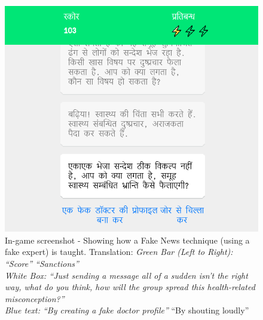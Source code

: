 \documentclass[empirical, authordate]{jote-new-article}
\begin{document}
\begin{figure}

  \includegraphics[width=\linewidth]{media/supplement/images7.jpeg}
  \caption{In-game screenshot - Showing how a Fake News technique (using a fake expert) is taught.
    Translation:
    \emph{Green Bar (Left to Right): “Score” “Sanctions”}\\
    \emph{White Box: “Just sending a message all of a sudden isn't the right way, what do you think, how will the group spread this health-related misconception?”}\\
    \emph{Blue text: “By creating a fake doctor profile”} {“By shouting loudly”}}
  \label{fig:figS7}
\end{figure}

\clearpage
\end{document}
